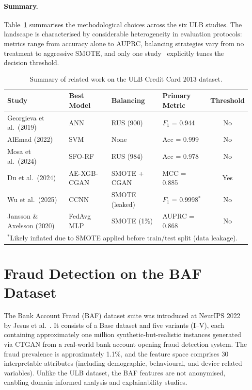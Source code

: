 \paragraph{Summary.}
Table~\ref{tab:rw_ulb_summary} summarises the methodological choices across the six ULB studies. The landscape is characterised by considerable heterogeneity in evaluation protocols: metrics range from accuracy alone to AUPRC, balancing strategies vary from no treatment to aggressive SMOTE, and only one study~\cite{du2024novel} explicitly tunes the decision threshold.

\begin{table}[H]
\centering
\caption{Summary of related work on the ULB Credit Card 2013 dataset.}
\label{tab:rw_ulb_summary}
\small
\begin{tabular}{l l l l c}
\toprule
Study & Best Model & Balancing & Primary Metric & Threshold \\
\midrule
Georgieva et al.\ (2019) & ANN          & RUS (900)       & $F_1$ = 0.944         & No  \\
AlEmad (2022)             & SVM          & None            & Acc = 0.999           & No  \\
Mosa et al.\ (2024)      & SFO-RF       & RUS (984)       & Acc = 0.978           & No  \\
Du et al.\ (2024)        & AE-XGB-CGAN  & SMOTE + CGAN    & MCC = 0.885           & Yes \\
Wu et al.\ (2025)        & CCNN         & SMOTE (leaked)  & $F_1$ = 0.9998$^{*}$  & No  \\
Jansson \& Axelsson (2020)& FedAvg MLP  & SMOTE (1\%)     & AUPRC = 0.868         & No  \\
\bottomrule
\multicolumn{5}{l}{\footnotesize $^{*}$Likely inflated due to SMOTE applied before train/test split (data leakage).}
\end{tabular}
\end{table}


\section{Fraud Detection on the BAF Dataset}
\label{sec:rw_baf}

The Bank Account Fraud (BAF) dataset suite was introduced at NeurIPS 2022 by Jesus et al.~\cite{jesus2022turning}. It consists of a Base dataset and five variants (I--V), each containing approximately one million synthetic-but-realistic instances generated via CTGAN from a real-world bank account opening fraud detection system. The fraud prevalence is approximately 1.1\%, and the feature space comprises 30 interpretable attributes (including demographic, behavioural, and device-related variables). Unlike the ULB dataset, the BAF features are not anonymised, enabling domain-informed analysis and explainability studies.

